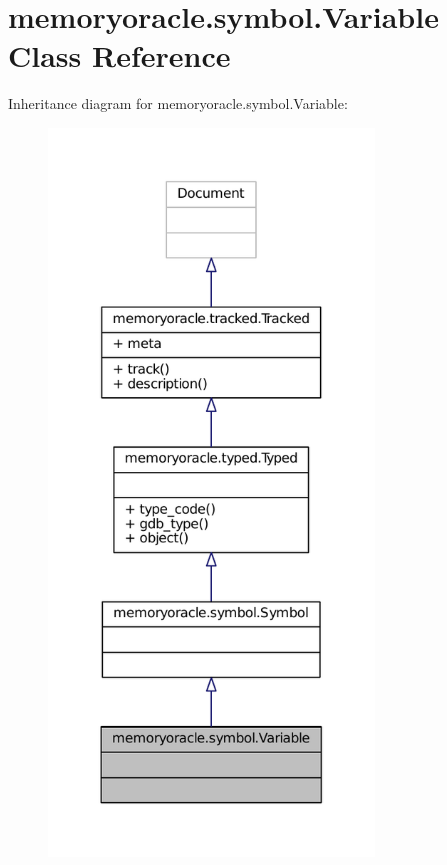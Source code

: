 \hypertarget{classmemoryoracle_1_1symbol_1_1Variable}{}\section{memoryoracle.\+symbol.\+Variable Class Reference}
\label{classmemoryoracle_1_1symbol_1_1Variable}


Inheritance diagram for memoryoracle.\+symbol.\+Variable\+:
\nopagebreak
\begin{figure}[H]
\begin{center}
\leavevmode
\includegraphics[width=245pt]{classmemoryoracle_1_1symbol_1_1Variable__inherit__graph}
\end{center}
\end{figure}


